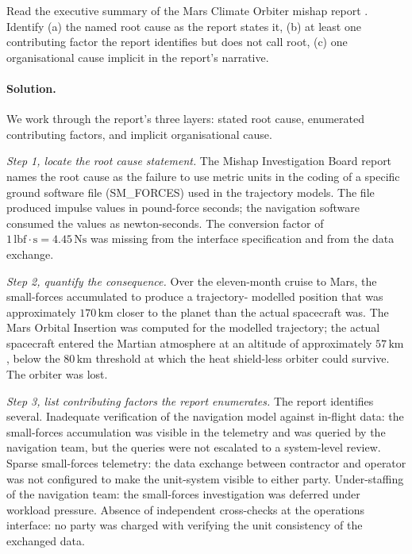 \begin{exercise}
Read the executive summary of the Mars Climate Orbiter mishap report
\cite{acc:nasa-mco-mib}. Identify (a) the named root cause as the
report states it, (b) at least one contributing factor the report
identifies but does not call root, (c) one organisational cause
implicit in the report's narrative.

\paragraph{Solution.}
We work through the report's three layers: stated root cause,
enumerated contributing factors, and implicit organisational cause.

\textit{Step 1, locate the root cause statement.} The Mishap
Investigation Board report names the root cause as the failure to use
metric units in the coding of a specific ground software file
(SM\_FORCES) used in the trajectory models. The file produced impulse
values in pound-force seconds; the navigation software consumed the
values as newton-seconds. The conversion factor of
$1 \,\text{lbf}\cdot\text{s} = 4.45 \,\si{\newton\second}$ was missing
from the interface specification and from the data exchange.

\textit{Step 2, quantify the consequence.} Over the eleven-month
cruise to Mars, the small-forces accumulated to produce a trajectory-
modelled position that was approximately $170 \,\si{\kilo\meter}$
closer to the planet than the actual spacecraft was. The Mars
Orbital Insertion was computed for the modelled trajectory; the
actual spacecraft entered the Martian atmosphere at an altitude of
approximately $57 \,\si{\kilo\meter}$, below the $80 \,\si{\kilo
\meter}$ threshold at which the heat shield-less orbiter could
survive. The orbiter was lost.

\textit{Step 3, list contributing factors the report enumerates.} The
report identifies several. Inadequate verification of the navigation
model against in-flight data: the small-forces accumulation was
visible in the telemetry and was queried by the navigation team, but
the queries were not escalated to a system-level review. Sparse
small-forces telemetry: the data exchange between contractor and
operator was not configured to make the unit-system visible to either
party. Under-staffing of the navigation team: the small-forces
investigation was deferred under workload pressure. Absence of
independent cross-checks at the operations interface: no party was
charged with verifying the unit consistency of the exchanged data.


\end{exercise}
